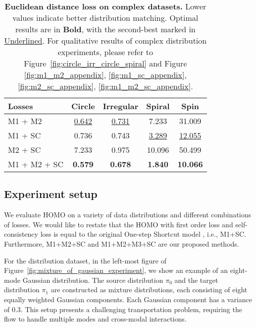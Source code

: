 \begin{table}[!ht]
\centering
\caption{
\textbf{Euclidean distance loss on complex datasets.} Lower values indicate better distribution matching. Optimal results are in \textbf{Bold}, with the second-best marked in \underline{Underlined}.
For qualitative results of complex distribution experiments, please refer to Figure~\ref{fig:circle_irr_circle_spiral} and Figure \ref{fig:m1_m2_appendix}, \ref{fig:m1_sc_appendix}, \ref{fig:m2_sc_appendix}, \ref{fig:m1_m2_sc_appendix}.
}
\label{tab:euclidean_distance_other_distributions}
\begin{tabular}{l|c|c|c|c}
\toprule
\textbf{Losses} & \textbf{Circle} & \textbf{Irregular} & \textbf{Spiral} & \textbf{Spin}\\
\midrule
M1 + M2          & \underline{0.642} & \underline{0.731} & 7.233 & 31.009\\
M1 + SC        & 0.736 & 0.743 & \underline{3.289} & \underline{12.055}\\
M2 + SC          & 7.233 & 0.975 & 10.096 & 50.499\\
M1 + M2 + SC      & \textbf{0.579} & \textbf{0.678} & \textbf{1.840} & \textbf{10.066}\\
\bottomrule
\end{tabular}
\end{table}



\subsection{Experiment setup} \label{sec:exp:experiment_setup}

We evaluate HOMO on a variety of data distributions and different combinations of losses. We would like to restate that the HOMO with first order loss and self-consistency loss is equal to the original One-step Shortcut model \cite{fhla24}, i.e., M1+SC. Furthermore, M1+M2+SC and M1+M2+M3+SC are our proposed methods. 

For the distribution dataset, in the left-most figure of Figure~\ref{fig:mixture_of_gaussian_experiment}, we show an example of an eight-mode Gaussian distribution. The source distribution $\pi_0$ and the target distribution $\pi_1$ are constructed as mixture distributions, each consisting of eight equally weighted Gaussian components. Each Gaussian component has a variance of $0.3$. This setup presents a challenging transportation problem, requiring the flow to handle multiple modes and cross-modal interactions.

